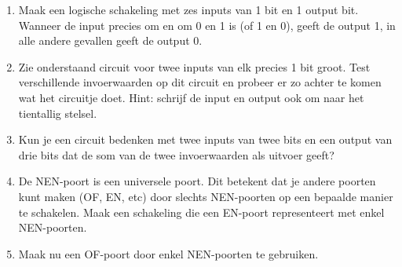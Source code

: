 \documentclass[10pt,a4paper,titlepage]{article}
\newcommand{\1}{\'{e}\'{e}n}
\begin{document}
\begin{enumerate}
\begin{enumerate}
\end{enumerate}
\item Maak een logische schakeling met zes inputs van 1 bit en 1 output bit. Wanneer de input precies om en om 0 en 1 is (of 1 en 0), geeft de output 1, in alle andere gevallen geeft de output 0.
\item Zie onderstaand circuit voor twee inputs van elk precies 1 bit groot. Test verschillende invoerwaarden op dit circuit en probeer er zo achter te komen wat het circuitje doet. Hint: schrijf de input en output ook om naar het tientallig stelsel.


\item Kun je een circuit bedenken met twee inputs van twee bits en een output van drie bits dat de som van de twee invoerwaarden als uitvoer geeft?
\item De NEN-poort is een universele poort. Dit betekent dat je andere poorten kunt maken (OF, EN, etc) door slechts NEN-poorten op een bepaalde manier te schakelen. Maak een schakeling die een EN-poort representeert met enkel NEN-poorten.
\item Maak nu een OF-poort door enkel NEN-poorten te gebruiken.
\end{enumerate}








\end{document}
